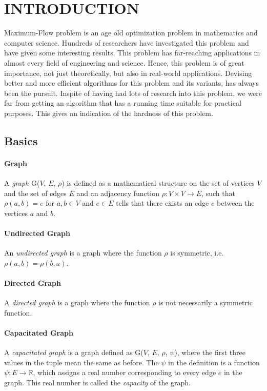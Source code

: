 \documentclass[BTech]{iitmdiss}
\begin{document}

 \chapter{INTRODUCTION}
 \label{chap:intro}
    Maximum-Flow problem is an age old optimization problem in mathematics and computer science. Hundreds of researchers have investigated this problem
    and have given some interesting results. This problem has far-reaching applications in almost every field of engineering and science. Hence, this 
    problem is of great importance, not just theoretically, but also in real-world applications. Devising better and more efficient algorithms
    for this problem and its variants, has always been the pursuit. Inspite of having had lots of research into this problem, we were far from getting an algorithm
    that has a running time suitable for practical purposes. This gives an indication of the hardness of this problem.
    
    \section{Basics}
      \subsubsection{Graph}
      A \textit{graph} G($V$, $E$, $\rho$) is defined as a mathematical structure on the set of vertices $V$ and the set of edges $E$ and an adjacency
      function $\rho : V \times V \rightarrow E$, such that $\rho(a,b) = e$ for $a,b \in V$ and $e \in E$ tells that there exists an edge $e$ between 
      the vertices $a$ and $b$.
      
      \subsubsection{Undirected Graph}
	An \textit{undirected graph} is a graph where the function $\rho$ is symmetric, i.e. $\rho(a,b) = \rho(b,a)$.
 
      \subsubsection{Directed Graph}
	A \textit{directed graph} is a graph where the function $\rho$ is not necessarily a symmetric function.
	
      \subsubsection{Capacitated Graph}
	A \textit{capacitated graph} is a graph defined as G($V$, $E$, $\rho$, $\psi$), where the first three values in the tuple mean the same as before.
	The $\psi$ in the definition is a function $\psi: E \rightarrow \mathbb{R}$, which assigns a real number corresponding to every edge $e$ in the 
	graph. This real number is called the \textit{capacity} of the graph.
      
\end{document}
